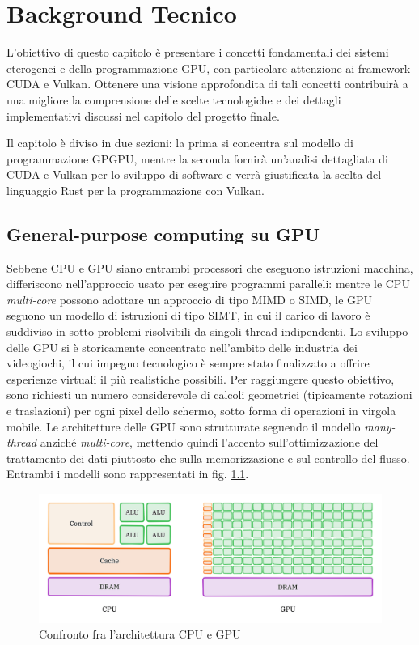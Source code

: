 \chapter{Background Tecnico}
\label{sec:background}

L'obiettivo di questo capitolo è presentare i concetti fondamentali dei sistemi eterogenei e della programmazione \gls{GPU}, con particolare attenzione ai framework \gls{CUDA} e Vulkan. Ottenere una visione approfondita di tali concetti contribuirà a una migliore la comprensione delle scelte tecnologiche e dei dettagli implementativi discussi nel capitolo del progetto finale.

Il capitolo è diviso in due sezioni: la prima si concentra sul modello di programmazione \gls{GPGPU}, mentre la seconda fornirà un'analisi dettagliata di \gls{CUDA} e Vulkan per lo sviluppo di software e verrà giustificata la scelta del linguaggio Rust per la programmazione con Vulkan.

\section[General-purpose computing su GPU]{General-purpose computing su GPU}

Sebbene \gls{CPU} e \gls{GPU} siano entrambi processori che eseguono istruzioni macchina, differiscono nell'approccio usato per eseguire programmi paralleli: mentre le \gls{CPU} \textit{multi-core} possono adottare un approccio di tipo \gls{MIMD} o \gls{SIMD}, le \gls{GPU} seguono un modello di istruzioni di tipo \gls{SIMT}, in cui il carico di lavoro è suddiviso in sotto-problemi risolvibili da singoli thread indipendenti. Lo sviluppo delle \gls{GPU} si è storicamente concentrato nell'ambito delle industria dei videogiochi, il cui impegno tecnologico è sempre stato finalizzato a offrire esperienze virtuali il più realistiche possibili. Per raggiungere questo obiettivo, sono richiesti un numero considerevole di calcoli geometrici (tipicamente rotazioni e traslazioni) per ogni pixel dello schermo, sotto forma di operazioni in virgola mobile. Le architetture delle \gls{GPU} sono strutturate seguendo il modello \textit{many-thread} anziché \textit{multi-core}, mettendo quindi l'accento sull'ottimizzazione del trattamento dei dati piuttosto che sulla memorizzazione e sul controllo del flusso.
Entrambi i modelli sono rappresentati in fig. \ref{fig:cpu_vs_gpu}.

\begin{figure}[ht]
    \centering
    \includegraphics[width=.9\linewidth]{images/chapter2/cpu_vs_gpu.png}
    \caption{Confronto fra l'architettura CPU e GPU}
    \label{fig:cpu_vs_gpu}
\end{figure}

